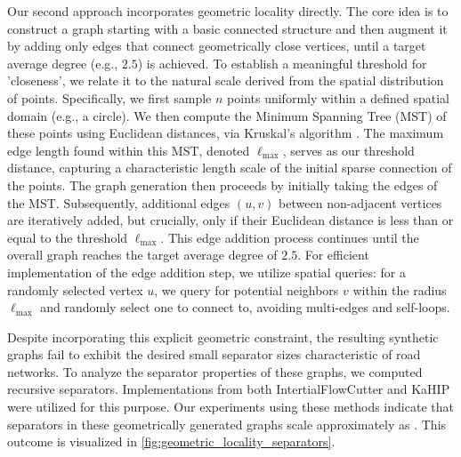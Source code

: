 Our second approach incorporates geometric locality directly.
The core idea is to construct a graph starting with a basic connected structure and then augment it by adding only edges that connect geometrically close vertices, until a target average degree (e.g., \(2.5\)) is achieved.
To establish a meaningful threshold for 'closeness', we relate it to the natural scale derived from the spatial distribution of points.
Specifically, we first sample \(n\) points uniformly within a defined spatial domain (e.g., a circle).
We then compute the Minimum Spanning Tree (MST) of these points using Euclidean distances, via Kruskal's algorithm \cite{kruskal_shortest_1956}.
The maximum edge length found within this MST, denoted \(\ell_{\max}\), serves as our threshold distance, capturing a characteristic length scale of the initial sparse connection of the points.
The graph generation then proceeds by initially taking the edges of the MST.
Subsequently, additional edges \((u, v)\) between non-adjacent vertices are iteratively added, but crucially, only if their Euclidean distance is less than or equal to the threshold \(\ell_{\max}\).
This edge addition process continues until the overall graph reaches the target average degree of \(2.5\).
For efficient implementation of the edge addition step, we utilize spatial queries: for a randomly selected vertex \(u\), we query for potential neighbors \(v\) within the radius \(\ell_{\max}\) and randomly select one to connect to, avoiding multi-edges and self-loops.

Despite incorporating this explicit geometric constraint, the resulting synthetic graphs fail to exhibit the desired small separator sizes characteristic of road networks.
To analyze the separator properties of these graphs, we computed recursive separators.
Implementations from both IntertialFlowCutter and KaHIP were utilized for this purpose.
Our experiments using these methods indicate that separators in these geometrically generated graphs scale approximately as .
This outcome is visualized in \cref{fig:geometric_locality_separators}.

